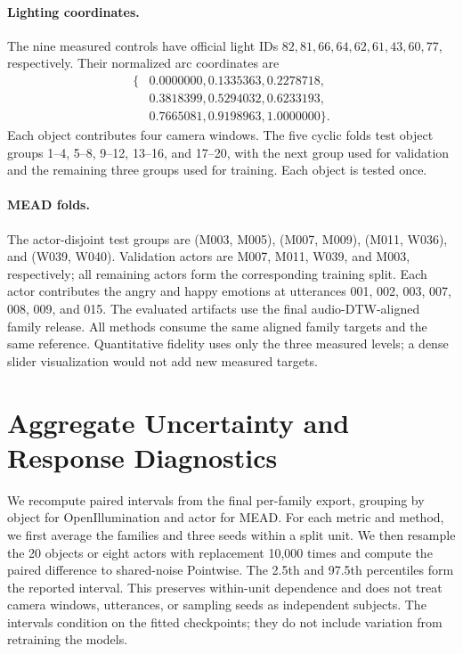 \paragraph{Lighting coordinates.}
The nine measured controls have official light IDs
$82,81,66,64,62,61,43,60,77$, respectively. Their normalized arc coordinates
are
\begin{equation*}
\begin{split}
\{&0.0000000,0.1335363,0.2278718,\\
  &0.3818399,0.5294032,0.6233193,\\
  &0.7665081,0.9198963,1.0000000\}.
\end{split}
\end{equation*}
Each object contributes four camera windows. The five cyclic folds test
object groups 1--4, 5--8, 9--12, 13--16, and 17--20, with the next group used
for validation and the remaining three groups used for training. Each object
is tested once.

\paragraph{MEAD folds.}
The actor-disjoint test groups are (M003, M005), (M007, M009), (M011, W036),
and (W039, W040). Validation actors are M007, M011, W039, and M003,
respectively; all remaining actors form the corresponding training split.
Each actor contributes the angry and happy emotions at utterances
001, 002, 003, 007, 008, 009, and 015. The evaluated artifacts use the final
audio-DTW-aligned family release. All methods consume the same aligned
family targets and the same reference. Quantitative fidelity uses only the
three measured levels; a dense slider visualization would not add new
measured targets.

\section{Aggregate Uncertainty and Response Diagnostics}
\label{sec:supp_uncertainty}
We recompute paired intervals from the final per-family export, grouping by
object for OpenIllumination and actor for MEAD. For each metric and method,
we first average the families and three seeds within a split unit. We then
resample the 20 objects or eight actors with replacement 10,000 times and
compute the paired difference to shared-noise Pointwise. The 2.5th and
97.5th percentiles form the reported interval. This preserves within-unit
dependence and does not treat camera windows, utterances, or sampling seeds
as independent subjects. The intervals condition on the fitted checkpoints;
they do not include variation from retraining the models.

